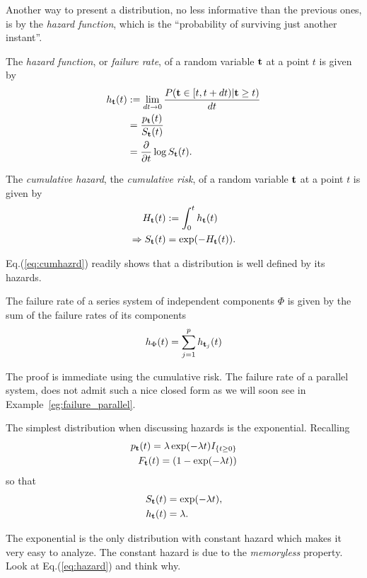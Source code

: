 Another way to present a distribution, no less informative than the previous ones, is by the \emph{hazard function}, which is the ``probability of surviving just another instant''.
\begin{definition}
The \emph{hazard function}, or \emph{failure rate}, of a random variable $\mathbf{t}$ at a point $t$ is given by 
\begin{align}
	h_{\mathbf{t}} (t) &:= \lim_{dt\to 0}\frac{P( \mathbf{t} \in [t,t+dt)|\mathbf{t} \geq t )}{dt} \label{eq:hazard}\\
	&= \frac{p_{\mathbf{t}} (t)}{S_{\mathbf{t}} (t)} \\
	&= \frac{\partial}{\partial t}\log S_{\mathbf{t}} (t).
\end{align}
\end{definition}





\begin{definition}
The \emph{cumulative hazard}, \aka the \emph{cumulative risk}, of a random variable $\mathbf{t}$ at a point $t$ is given by 
\begin{align}
	H_{\mathbf{t}} (t) &:= \int_{0}^{t}h_{\mathbf{t}} (t) \\
	\Rightarrow S_{\mathbf{t}} (t) &= \exp(-H_{\mathbf{t}} (t)). \label{eq:cumhazrd}
\end{align}
\end{definition}
Eq.(\ref{eq:cumhazrd}) readily shows that a distribution is well defined by its hazards.



\begin{theorem}
\label{thm:ifr_closure}
The failure rate of a series system of independent components $\Phi$ is given by the sum of the failure rates of its components
\begin{align}
	h_{\Phi} (t)= \sum_{j=1}^{p} h_{\mathbf{t}_j} (t)
\end{align}
\end{theorem}
The proof is immediate using the cumulative risk.
The failure rate of a parallel system, does not admit such a nice closed form as we will soon see in Example~\ref{eg:failure_parallel}.




\begin{example}
The simplest distribution when discussing hazards is the exponential.
Recalling
\begin{align}
	p_{\mathbf{t}} (t)= \lambda \exp(-\lambda t) I_{\{ t \geq 0 \}} \\
	F_{\mathbf{t}} (t)= (1-\exp(-\lambda t)) 
\end{align}
so that 
\begin{align}
	S_{\mathbf{t}} (t) &= \exp(-\lambda t), \\
	h_{\mathbf{t}} (t) &= \lambda.
\end{align}
\end{example}
The exponential is the only distribution with constant hazard which makes it very easy to analyze.
The constant hazard is due to the \emph{memoryless} property. Look at Eq.(\ref{eq:hazard}) and think why.


